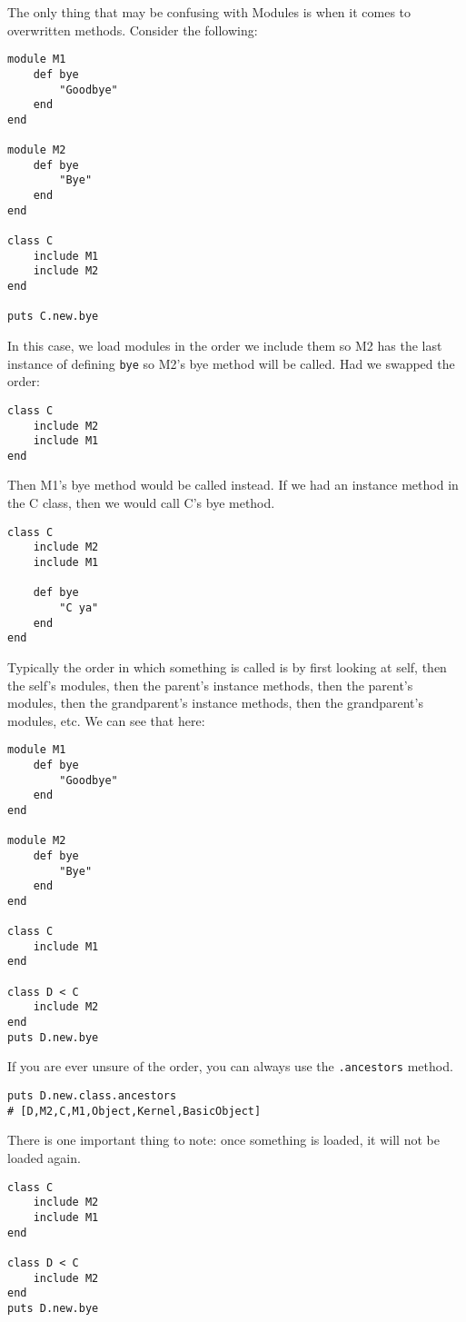 \documentclass[main.tex]{subfiles}
\begin{document}
The only thing that may be confusing with Modules is when it comes to overwritten methods. Consider the following:
\begin{lstlisting}[style=MyRubyStyle]
module M1
    def bye
        "Goodbye"
    end
end

module M2
    def bye
        "Bye"
    end
end

class C
    include M1
    include M2
end

puts C.new.bye
\end{lstlisting}
In this case, we load modules in the order we include them so M2 has the last instance of defining \texttt{bye} so M2's bye method will be called. Had we swapped the order:
\begin{lstlisting}[style=MyRubyStyle]
class C
    include M2
    include M1
end
\end{lstlisting}
Then M1's bye method would be called instead. 
If we had an instance method in the C class, then we would call C's bye method. 
\begin{lstlisting}[style=MyRubyStyle]
class C
    include M2
    include M1
    
    def bye
        "C ya"
    end
end
\end{lstlisting}
Typically the order in which something is called is by first looking at self, then the self's modules, then the parent's instance methods, then the parent's modules, then the grandparent's instance methods, then the grandparent's modules, etc. 
We can see that here:
\begin{lstlisting}[style=MyRubyStyle]
module M1
    def bye
        "Goodbye"
    end
end

module M2
    def bye
        "Bye"
    end
end

class C
    include M1
end

class D < C
    include M2
end
puts D.new.bye
\end{lstlisting}
If you are ever unsure of the order, you can always use the \texttt{.ancestors} method. 
\begin{lstlisting}[style=MyRubyStyle]
puts D.new.class.ancestors
# [D,M2,C,M1,Object,Kernel,BasicObject]
\end{lstlisting}
There is one important thing to note: once something is loaded, it will not be loaded again.
\begin{lstlisting}[style=MyRubyStyle]
class C
    include M2
    include M1
end

class D < C
    include M2
end
puts D.new.bye
\end{lstlisting}
\end{document}

